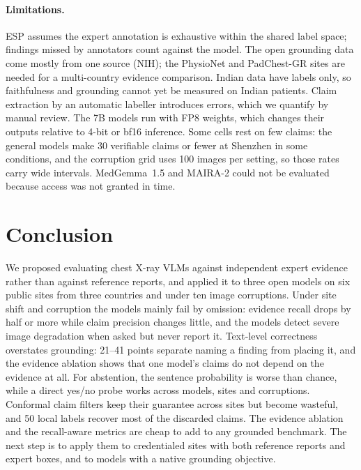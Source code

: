 \documentclass[pdflatex,sn-mathphys-num]{sn-jnl}
\theoremstyle{thmstyleone}
\begin{document}
\paragraph{Limitations.} ESP assumes the expert annotation is exhaustive within the shared label space; findings missed by annotators count against the model. The open grounding data come mostly from one source (NIH); the PhysioNet and PadChest-GR sites are needed for a multi-country evidence comparison. Indian data have labels only, so faithfulness and grounding cannot yet be measured on Indian patients. Claim extraction by an automatic labeller introduces errors, which we quantify by manual review. The 7B models run with FP8 weights, which changes their outputs relative to 4-bit or bf16 inference. Some cells rest on few claims: the general models make 30 verifiable claims or fewer at Shenzhen in some conditions, and the corruption grid uses 100 images per setting, so those rates carry wide intervals. MedGemma~1.5 and MAIRA-2 could not be evaluated because access was not granted in time.

\section{Conclusion}\label{sec:conclusion}

We proposed evaluating chest X-ray VLMs against independent expert evidence rather than against reference reports, and applied it to three open models on six public sites from three countries and under ten image corruptions. Under site shift and corruption the models mainly fail by omission: evidence recall drops by half or more while claim precision changes little, and the models detect severe image degradation when asked but never report it. Text-level correctness overstates grounding: 21--41 points separate naming a finding from placing it, and the evidence ablation shows that one model's claims do not depend on the evidence at all. For abstention, the sentence probability is worse than chance, while a direct yes/no probe works across models, sites and corruptions. Conformal claim filters keep their guarantee across sites but become wasteful, and 50 local labels recover most of the discarded claims. The evidence ablation and the recall-aware metrics are cheap to add to any grounded benchmark. The next step is to apply them to credentialed sites with both reference reports and expert boxes, and to models with a native grounding objective.
\end{document}
